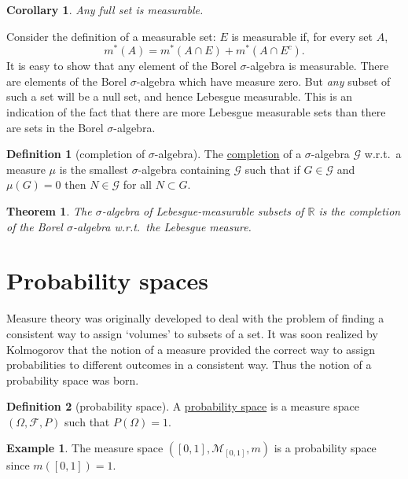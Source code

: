 \documentclass[a4paper]{scrartcl}
\newcommand{\R}{\mathbb{R}}
\newcommand{\defn}[1]{\ul{#1}}
\theoremstyle{definition}
\newtheorem{definition}{Definition}[section]
\newtheorem{example}{Example}[section]
\theoremstyle{plain}
\newtheorem{theorem}{Theorem}[section]
\newtheorem{corollary}{Corollary}[section]
\theoremstyle{remark}
\begin{document}
\begin{corollary}
  \label{cor:fullsetsaremeasurable}
  Any full set is measurable.
\end{corollary}

Consider the definition of a measurable set: $E$ is measurable if, for every set $A$,
\begin{equation*}
  m^{*}(A) = m^{*}(A \cap E) + m^{*}(A \cap E^{c}).
\end{equation*}
It is easy to show that any element of the Borel $\sigma$-algebra is measurable. There are elements of the Borel $\sigma$-algebra which have measure zero. But \emph{any} subset of such a set will be a null set, and hence Lebesgue measurable. This is an indication of the fact that there are more Lebesgue measurable sets than there are sets in the Borel $\sigma$-algebra.

\begin{definition}[completion of $\sigma$-algebra]
  \label{def:completionofsigmaalgebra}
  The \defn{completion} of a $\sigma$-algebra $\mathcal{G}$ w.r.t.\ a measure $\mu$ is the smallest $\sigma$-algebra containing $\mathcal{G}$ such that if $G \in \mathcal{G}$ and $\mu(G) = 0$ then $N \in \mathcal{G}$ for all $N \subset G$.
\end{definition}

\begin{theorem}
  The $\sigma$-algebra of Lebesgue-measurable subsets of $\R$ is the completion of the Borel $\sigma$-algebra w.r.t.\ the Lebesgue measure.
\end{theorem}

\section{Probability spaces}\label{sec:probabilityspaces}
Measure theory was originally developed to deal with the problem of finding a consistent way to assign `volumes' to subsets of a set. It was soon realized by Kolmogorov that the notion of a measure provided the correct way to assign probabilities to different outcomes in a consistent way. Thus the notion of a probability space was born.

\begin{definition}[probability space]
  \label{def:probabilityspace}
  A \defn{probability space} is a measure space $(\Omega, \mathcal{F}, P)$ such that $P(\Omega) = 1$.
\end{definition}

\begin{example}
  The measure space $\left( [0, 1], \mathcal{M}_{[0, 1]}, m \right)$ is a probability space since $m([0, 1]) = 1$.
\end{example}
\end{document}
